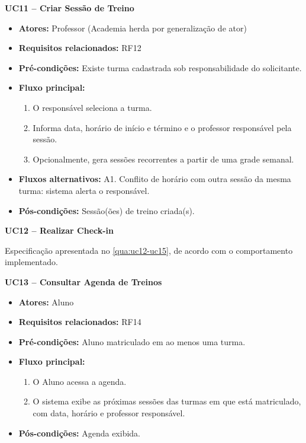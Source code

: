 \noindent\textbf{UC11 -- Criar Sessão de Treino}
\begin{itemize}[leftmargin=*, itemsep=0pt, topsep=2pt]
  \item \textbf{Atores:} Professor (Academia herda por generalização de ator)
  \item \textbf{Requisitos relacionados:} RF12
  \item \textbf{Pré-condições:} Existe turma cadastrada sob responsabilidade do solicitante.
  \item \textbf{Fluxo principal:}
  \begin{enumerate}[label=\arabic*., itemsep=0pt, topsep=0pt]
    \item O responsável seleciona a turma.
    \item Informa data, horário de início e término e o professor responsável pela sessão.
    \item Opcionalmente, gera sessões recorrentes a partir de uma grade semanal.
  \end{enumerate}
  \item \textbf{Fluxos alternativos:} A1. Conflito de horário com outra sessão da mesma turma: sistema alerta o responsável.
  \item \textbf{Pós-condições:} Sessão(ões) de treino criada(s).
\end{itemize}
\medskip

\noindent\textbf{UC12 -- Realizar Check-in}
\par\noindent Especificação apresentada no \autoref{qua:uc12-uc15}, de acordo com o comportamento implementado.

\medskip

\noindent\textbf{UC13 -- Consultar Agenda de Treinos}
\begin{itemize}[leftmargin=*, itemsep=0pt, topsep=2pt]
  \item \textbf{Atores:} Aluno
  \item \textbf{Requisitos relacionados:} RF14
  \item \textbf{Pré-condições:} Aluno matriculado em ao menos uma turma.
  \item \textbf{Fluxo principal:}
  \begin{enumerate}[label=\arabic*., itemsep=0pt, topsep=0pt]
    \item O Aluno acessa a agenda.
    \item O sistema exibe as próximas sessões das turmas em que está matriculado, com data, horário e professor responsável.
  \end{enumerate}
  \item \textbf{Pós-condições:} Agenda exibida.
\end{itemize}
\medskip

